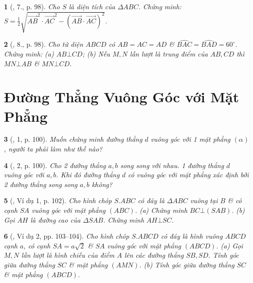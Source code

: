\documentclass{article}
\newtheorem{baitoan}{}
\begin{document}
\begin{baitoan}[\cite{SGK_Toan_11_hinh_hoc_co_ban}, 7., p. 98]
	Cho $S$ là diện tích của $\Delta ABC$. Chứng minh: $S = \frac{1}{2}\sqrt{\overrightarrow{AB}^2\cdot\overrightarrow{AC}^2 - (\overrightarrow{AB}\cdot\overrightarrow{AC})^2}$.
\end{baitoan}

\begin{baitoan}[\cite{SGK_Toan_11_hinh_hoc_co_ban}, 8., p. 98]
	Cho tứ diện $ABCD$ có $AB = AC = AD$ \& $\widehat{BAC} = \widehat{BAD} = 60^\circ$. Chứng minh: (a) $AB\bot CD$; (b) Nếu $M,N$ lần lượt là trung điểm của $AB,CD$ thì $MN\bot AB$ \& $MN\bot CD$.
\end{baitoan}


\section{Đường Thẳng Vuông Góc với Mặt Phẳng}

\begin{baitoan}[\cite{SGK_Toan_11_hinh_hoc_co_ban}, 1, p. 100]
	Muốn chứng minh đường thẳng $d$ vuông góc với 1 mặt phẳng $(\alpha)$, người ta phải làm như thế nào?
\end{baitoan}

\begin{baitoan}[\cite{SGK_Toan_11_hinh_hoc_co_ban}, 2, p. 100]
	Cho 2 đường thẳng $a,b$ song song với nhau. 1 đường thẳng $d$ vuông góc với $a,b$. Khi đó đường thẳng $d$ có vuông góc với mặt phẳng xác định bởi 2 đường thẳng song song $a,b$ không?
\end{baitoan}

\begin{baitoan}[\cite{SGK_Toan_11_hinh_hoc_co_ban}, Ví dụ 1, p. 102]
	Cho hình chóp $S.ABC$ có đáy là $\Delta ABC$ vuông tại $B$ \& có cạnh $SA$ vuông góc với mặt phẳng $(ABC)$. (a) Chứng minh $BC\bot(SAB)$. (b) Gọi $AH$ là đường cao của $\Delta SAB$. Chứng minh $AH\bot SC$.
\end{baitoan}

\begin{baitoan}[\cite{SGK_Toan_11_hinh_hoc_co_ban}, Ví dụ 2, pp. 103--104]
	Cho hình chóp $S.ABCD$ có đáy là hình vuông $ABCD$ cạnh $a$, có cạnh $SA = a\sqrt{2}$ \& $SA$ vuông góc với mặt phẳng $(ABCD)$. (a) Gọi $M,N$ lần lượt là hình chiếu của điểm $A$ lên các đường thẳng $SB,SD$. Tính góc giữa đường thẳng $SC$ \& mặt phẳng $(AMN)$. (b) Tính góc giữa đường thẳng $SC$ \& mặt phẳng $(ABCD)$.
\end{baitoan}
\end{document}
